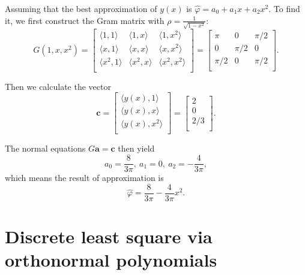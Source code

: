 \documentclass[a4paper]{article}
\begin{document}
Assuming that the best approximation of $y(x)$ is $\hat{\varphi} = a_0 + a_1 x + a_2 x^2$. To find it, we first construct the Gram matrix with $\rho = \frac{1}{\sqrt{1 - x^2}}$:
\begin{equation}
    G(1, x, x^2) = 
    \begin{bmatrix}
        \langle 1, 1 \rangle & \langle 1, x \rangle & \langle 1, x^2 \rangle \\
        \langle x, 1 \rangle & \langle x, x \rangle & \langle x, x^2 \rangle \\
        \langle x^2, 1 \rangle & \langle x^2, x \rangle & \langle x^2, x^2 \rangle \\
    \end{bmatrix}
    = \begin{bmatrix}
        \pi & 0 & \pi/2 \\
        0 & \pi/2 & 0 \\
        \pi/2 & 0 & \pi/2 \\
    \end{bmatrix}.
    \label{eq:3_gram_matrix}
\end{equation}

Then we calculate the vector 
\begin{equation}
    \mathbf{c} = \begin{bmatrix}
        \langle y(x), 1 \rangle \\
        \langle y(x), x \rangle \\
        \langle y(x), x^2 \rangle \\
    \end{bmatrix}
    = \begin{bmatrix}
        2 \\ 0 \\ 2/3 \\
    \end{bmatrix}.
    \label{eq:3_vector_c}
\end{equation}

The normal equations $G\mathbf{a} = \mathbf{c}$ then yield 
\begin{equation}
    a_0 = \frac{8}{3\pi},\ a_1 = 0,\ a_2 = -\frac{4}{3\pi},
    \label{eq:3_normal_equations}
\end{equation}
which means the result of approximation is 
\begin{equation}
    \hat{\varphi} = \frac{8}{3\pi} - \frac{4}{3\pi}x^2.
    \label{eq:3_least_square_approximation}
\end{equation}

\section{Discrete least square via orthonormal polynomials}
\end{document}

